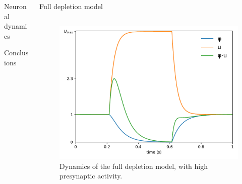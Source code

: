 \documentclass[final,hyperref={pdfpagelabels=false}]{beamer}
\begin{document}
\begin{frame}
\begin{columns}
\begin{column}{.30\textwidth}
\begin{minipage}[T]{.95\textwidth}
{\begin{block}{Neuronal dynamics}
						\end{block}
						
						
						
						\vfill
						\begin{emphblock}{Conclusions}
						\end{emphblock}

					 } %
				\end{minipage}
		\end{column}
		\begin{column}{.64\textwidth}
				\begin{minipage}[T]{.95\textwidth}
					\parbox[t][\columnheight]{\textwidth}{

					\begin{block}{Full depletion model}
						\begin{columns}
							\begin{column}[T]{.5\textwidth}
							\begin{figure}
								\includegraphics[width=1\linewidth]{full_depletion.pdf}
								\caption{Dynamics of the full depletion model, with high presynaptic activity.}
								\label{fig:full_depletion}
							\end{figure}	
							\end{column}							
							

\end{columns}
\end{block}}
\end{minipage}
\end{column}
\end{columns}
\end{frame}
\end{document}
